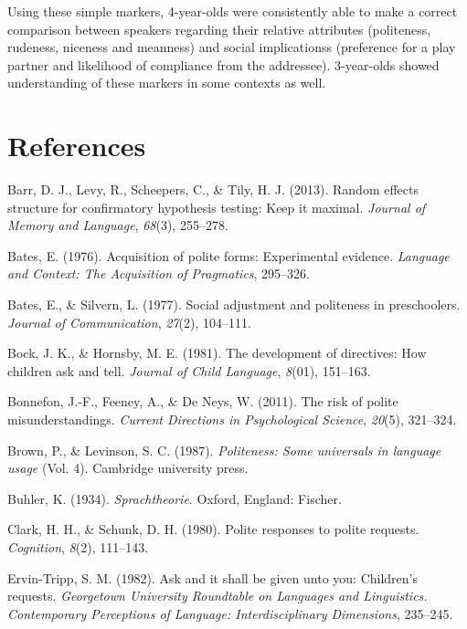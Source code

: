 \documentclass[10pt, letterpaper]{article}
\begin{document}
Using these simple markers, 4-year-olds were consistently able to make a
correct comparison between speakers regarding their relative attributes
(politeness, rudeness, niceness and meanness) and social implicationss
(preference for a play partner and likelihood of compliance from the
addressee). 3-year-olds showed understanding of these markers in some
contexts as well.

\section{References}\label{references}

\setlength{\parindent}{-0.1in} \setlength{\leftskip}{0.125in} \noindent

\hypertarget{refs}{}
\hypertarget{ref-barr2013}{}
Barr, D. J., Levy, R., Scheepers, C., \& Tily, H. J. (2013). Random
effects structure for confirmatory hypothesis testing: Keep it maximal.
\emph{Journal of Memory and Language}, \emph{68}(3), 255--278.

\hypertarget{ref-bates1976}{}
Bates, E. (1976). Acquisition of polite forms: Experimental evidence.
\emph{Language and Context: The Acquisition of Pragmatics}, 295--326.

\hypertarget{ref-bates1977}{}
Bates, E., \& Silvern, L. (1977). Social adjustment and politeness in
preschoolers. \emph{Journal of Communication}, \emph{27}(2), 104--111.

\hypertarget{ref-bock1981}{}
Bock, J. K., \& Hornsby, M. E. (1981). The development of directives:
How children ask and tell. \emph{Journal of Child Language},
\emph{8}(01), 151--163.

\hypertarget{ref-bonnefon2011}{}
Bonnefon, J.-F., Feeney, A., \& De Neys, W. (2011). The risk of polite
misunderstandings. \emph{Current Directions in Psychological Science},
\emph{20}(5), 321--324.

\hypertarget{ref-brown1987}{}
Brown, P., \& Levinson, S. C. (1987). \emph{Politeness: Some universals
in language usage} (Vol. 4). Cambridge university press.

\hypertarget{ref-buhler1934}{}
Buhler, K. (1934). \emph{Sprachtheorie}. Oxford, England: Fischer.

\hypertarget{ref-clark1980}{}
Clark, H. H., \& Schunk, D. H. (1980). Polite responses to polite
requests. \emph{Cognition}, \emph{8}(2), 111--143.

\hypertarget{ref-ervin1982}{}
Ervin-Tripp, S. M. (1982). Ask and it shall be given unto you:
Children's requests. \emph{Georgetown University Roundtable on Languages
and Linguistics. Contemporary Perceptions of Language: Interdisciplinary
Dimensions}, 235--245.
\end{document}
